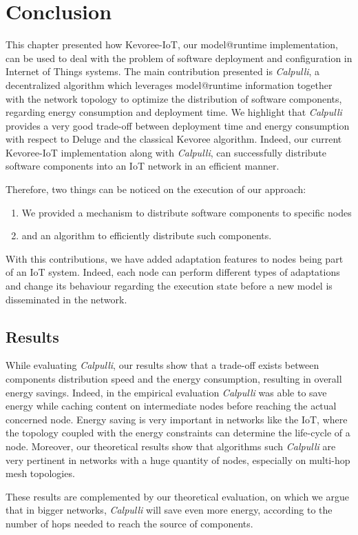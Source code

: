 \section{Conclusion}
This chapter presented how Kevoree-IoT, our model@runtime implementation, can be used to deal with the problem of software deployment and configuration in Internet of Things systems. 
The main contribution presented is \textit{Calpulli}, a decentralized algorithm which leverages model@runtime information together with the network topology to optimize the distribution of software components, regarding energy consumption and deployment time. 
We highlight that \textit{Calpulli} provides a very good trade-off between deployment time and energy consumption with respect to Deluge and the classical Kevoree algorithm.
Indeed, our current Kevoree-IoT implementation along with \textit{Calpulli}, can successfully distribute software components into an IoT network in an efficient manner.

Therefore, two things can be noticed on the execution of our approach:

\begin{enumerate}
	\item We provided a mechanism to distribute software components to specific nodes
	\item and an algorithm to efficiently distribute such components.
\end{enumerate}

With this contributions, we have added adaptation features to nodes being part of an IoT system.
Indeed, each node can perform different types of adaptations and change its behaviour regarding the execution state before a new model is disseminated in the network.

\subsection*{Results}
While evaluating \textit{Calpulli}, our results show that a trade-off exists between components distribution speed and the energy consumption, resulting in overall energy savings.
Indeed, in the empirical evaluation \textit{Calpulli} was able to save energy while caching content on intermediate nodes before reaching the actual concerned node.
Energy saving is very important in networks like the IoT, where the topology coupled with the energy constraints can determine the life-cycle of a node.
Moreover, our theoretical results show that algorithms such \textit{Calpulli} are very pertinent in networks with a huge quantity of nodes, especially on multi-hop mesh topologies.

These results are complemented by our theoretical evaluation, on which we argue that in bigger networks, \textit{Calpulli} will save even more energy, according to the number of hops needed to reach the source of components.